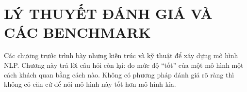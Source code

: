 \chapter{LÝ THUYẾT ĐÁNH GIÁ VÀ CÁC BENCHMARK}
\label{chap:evaluation}

Các chương trước trình bày những kiến trúc và kỹ thuật để xây dựng mô hình NLP. Chương này trả lời câu hỏi còn lại: đo mức độ “tốt” của một mô hình một cách khách quan bằng cách nào. Không có phương pháp đánh giá rõ ràng thì không có căn cứ để nói mô hình này tốt hơn mô hình kia.